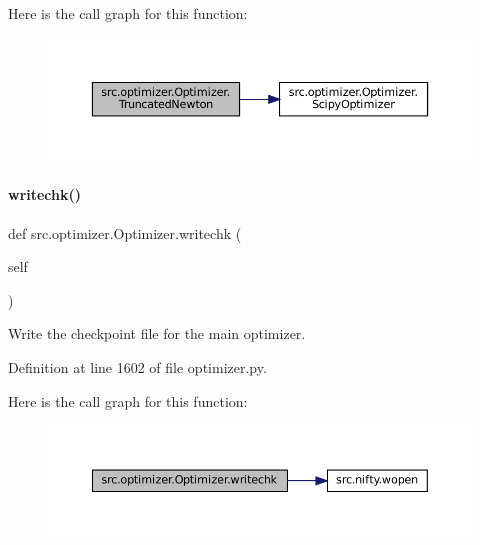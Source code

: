 Here is the call graph for this function\+:
\nopagebreak
\begin{figure}[H]
\begin{center}
\leavevmode
\includegraphics[width=350pt]{classsrc_1_1optimizer_1_1Optimizer_aba52ed682c83784e4523223c0bbb018b_cgraph}
\end{center}
\end{figure}
\mbox{\label{classsrc_1_1optimizer_1_1Optimizer_a30bd3b593b783f2e49e15d84d45927c3}} 
\paragraph{\texorpdfstring{writechk()}{writechk()}}
{\footnotesize\ttfamily def src.\+optimizer.\+Optimizer.\+writechk (\begin{DoxyParamCaption}\item[{}]{self }\end{DoxyParamCaption})}



Write the checkpoint file for the main optimizer. 



Definition at line 1602 of file optimizer.\+py.

Here is the call graph for this function\+:
\nopagebreak
\begin{figure}[H]
\begin{center}
\leavevmode
\includegraphics[width=350pt]{classsrc_1_1optimizer_1_1Optimizer_a30bd3b593b783f2e49e15d84d45927c3_cgraph}
\end{center}
\end{figure}


